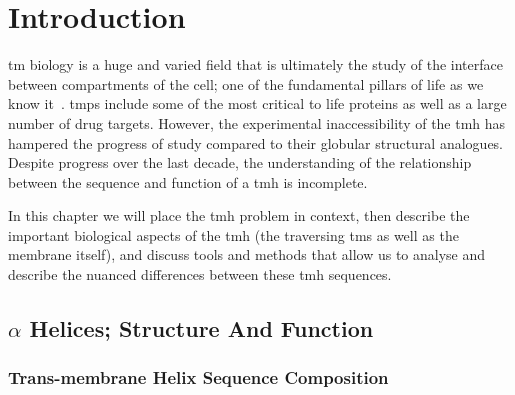 \chapter{Introduction}

\gls{tm} biology is a huge and varied field that is ultimately the study of the interface between compartments of the cell; one of the fundamental pillars of life as we know it~\cite{Ladokhin2015}. \gls{tmp}s include some of the most critical to life proteins as well as a large number of drug targets.
However, the experimental inaccessibility of the \gls{tmh} has hampered the progress of study compared to their globular structural analogues. Despite progress over the last decade, the understanding of the relationship between the sequence and function of a \gls{tmh} is incomplete.

In this chapter we will place the \gls{tmh} problem in context, then describe the important biological aspects of the \gls{tmh} (the traversing \gls{tms} as well as the membrane itself), and discuss tools and methods that allow us to analyse and describe the nuanced differences between these \gls{tmh} sequences.

\section{$\alpha$ Helices; Structure And Function}

\subsection{Trans-membrane Helix Sequence Composition}

